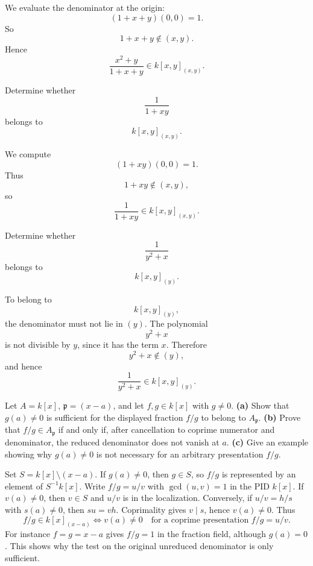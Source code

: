 \begin{solution}
We evaluate the denominator at the origin:
\[
(1+x+y)(0,0)=1.
\]
So
\[
1+x+y\notin (x,y).
\]
Hence
\[
\frac{x^2+y}{1+x+y}\in k[x,y]_{(x,y)}.
\]
\end{solution}


\begin{problem}[CP-V-0071]
\label{prob:cp-v-0071}
Determine whether
\[
\frac{1}{1+xy}
\]
belongs to
\[
k[x,y]_{(x,y)}.
\]
\end{problem}

\begin{solution}
We compute
\[
(1+xy)(0,0)=1.
\]
Thus
\[
1+xy\notin (x,y),
\]
so
\[
\frac{1}{1+xy}\in k[x,y]_{(x,y)}.
\]
\end{solution}


\begin{problem}[CP-V-0072]
\label{prob:cp-v-0072}
Determine whether
\[
\frac{1}{y^2+x}
\]
belongs to
\[
k[x,y]_{(y)}.
\]
\end{problem}

\begin{solution}
To belong to
\[
k[x,y]_{(y)},
\]
the denominator must not lie in \((y)\). The polynomial
\[
y^2+x
\]
is not divisible by \(y\), since it has the term \(x\). Therefore
\[
y^2+x\notin (y),
\]
and hence
\[
\frac{1}{y^2+x}\in k[x,y]_{(y)}.
\]
\end{solution}


\begin{problem}[CP-V-0075]
\label{prob:cp-v-0075}
Let $A=k[x]$, $\mathfrak p=(x-a)$, and let $f,g\in k[x]$ with $g\ne0$.
\textbf{(a)} Show that $g(a)\ne0$ is sufficient for the displayed
fraction $f/g$ to belong to $A_{\mathfrak p}$.
\textbf{(b)} Prove that $f/g\in A_{\mathfrak p}$ if and only if,
after cancellation to coprime numerator and denominator, the
reduced denominator does not vanish at $a$.
\textbf{(c)} Give an example showing why $g(a)\ne0$ is not necessary
for an arbitrary presentation $f/g$.
\end{problem}

\begin{solution}
Set $S=k[x]\setminus(x-a)$. If $g(a)\ne0$, then $g\in S$, so
$f/g$ is represented by an element of $S^{-1}k[x]$.
Write $f/g=u/v$ with $\gcd(u,v)=1$ in the PID $k[x]$.
If $v(a)\ne0$, then $v\in S$ and $u/v$ is in the localization.
Conversely, if $u/v=h/s$ with $s(a)\ne0$, then $su=vh$.
Coprimality gives $v\mid s$, hence $v(a)\ne0$.
Thus
\[
\boxed{f/g\in k[x]_{(x-a)}\iff v(a)\ne0
\quad\text{for a coprime presentation }f/g=u/v.}
\]
For instance $f=g=x-a$ gives $f/g=1$ in the fraction field,
although $g(a)=0$. This shows why the test on the original
unreduced denominator is only sufficient.
\end{solution}



